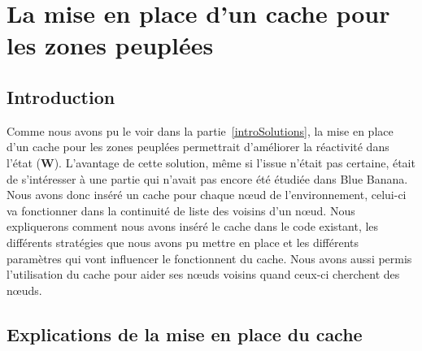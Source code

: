 \section{La mise en place d'un cache pour les zones peuplées}
\subsection{Introduction}
Comme nous avons pu le voir dans la partie~\ref{introSolutions}, la mise en place d'un cache pour les zones peuplées permettrait d'améliorer la réactivité dans l'état (\textbf{W}). L'avantage de cette solution, même si l'issue n'était pas certaine, était de s'intéresser à une partie qui n'avait pas encore été étudiée dans Blue Banana. Nous avons donc inséré un cache pour chaque nœud de l'environnement, celui-ci va fonctionner dans la continuité de liste des voisins d'un nœud. Nous expliquerons comment nous avons inséré le cache dans le code existant, les différents stratégies que nous avons pu mettre en place et les différents paramètres qui vont influencer le fonctionnent du cache. Nous avons aussi permis l'utilisation du cache pour aider ses nœuds voisins quand ceux-ci cherchent des nœuds.
 
\subsection{Explications de la mise en place du cache}

